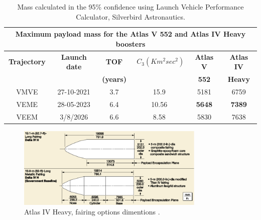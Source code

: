 \begin{table}[htb!]
  \centering
    \begin{tabular}{|c|r|r|r|r|r|}
    \multicolumn{6}{c}{\textbf{Maximum payload mass for the Atlas V 552 and Atlas IV Heavy boosters}} \bigstrut[b]\\
    \hline
    \textbf{Trajectory} & \multicolumn{1}{c|}{\textbf{Launch date}} & \multicolumn{1}{c|}{\textbf{TOF }} & $C_3(Km^{2}sec^{2})$ & \multicolumn{1}{c|}{\textbf{Atlas V }} & \multicolumn{1}{c|}{\textbf{Atlas IV}} \bigstrut[t]\\
    \textbf{} & \multicolumn{1}{c|}{\textbf{}} & \multicolumn{1}{c|}{\textbf{(years)}} & \multicolumn{1}{c|}{\textbf{}} & \multicolumn{1}{c|}{\textbf{552}} & \multicolumn{1}{c|}{\textbf{Heavy}} \bigstrut[b]\\
    \hline
    VMVE  & \multicolumn{1}{c|}{27-10-2021} & \multicolumn{1}{c|}{3.7} & \multicolumn{1}{c|}{15.9} & \multicolumn{1}{c|}{5181} & \multicolumn{1}{c|}{6759} \bigstrut\\
    \hline
    VEME  & \multicolumn{1}{c|}{28-05-2023} & \multicolumn{1}{c|}{6.4} & \multicolumn{1}{c|}{10.56} & \multicolumn{1}{c|}{\textbf{5648}} & \multicolumn{1}{c|}{\textbf{7389}} \bigstrut\\
    \hline
    VEEM  & \multicolumn{1}{c|}{3/8/2026} & \multicolumn{1}{c|}{6.6} & \multicolumn{1}{c|}{8.58} & \multicolumn{1}{c|}{5830} & \multicolumn{1}{c|}{7638} \bigstrut\\
    \hline
    \end{tabular}%
    \caption{Mass calculated in the 95\% confidence using Launch Vehicle Performance Calculator, Silverbird Astronautics.}
  \label{tab:trajKg}%
\end{table}%

\begin{figure}[htb!]
\centering
\includegraphics[width=0.8\textwidth]{figures/Orbiter/fairingsIV.png}
\caption{Atlas IV Heavy, fairing options dimentions \cite{Atlasm}.}
\end{figure}

